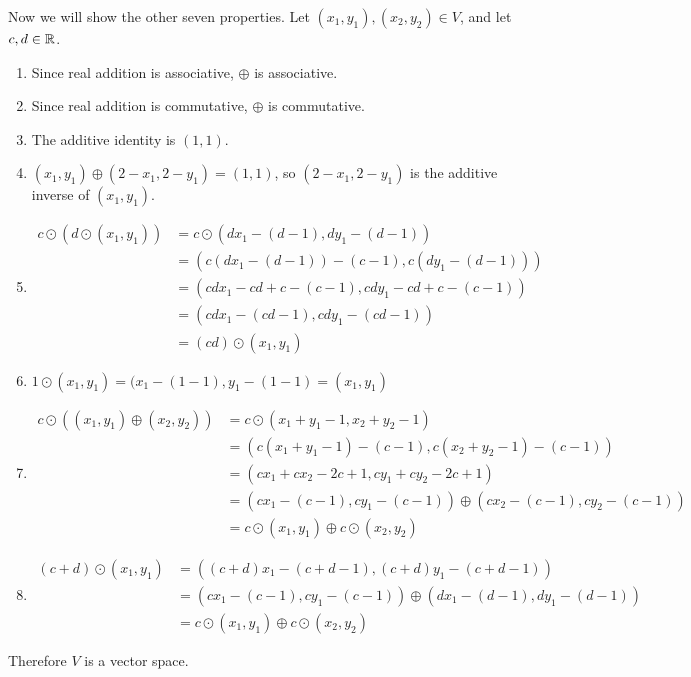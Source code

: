 \documentclass{sbgLAquiz}
\begin{document}
\begin{solution}
Now we will show the other seven properties.  Let $(x_1,y_1), (x_2,y_2) \in V$, and let $c,d \in \mathbb{R}$.
\begin{enumerate}[1)]
\item Since real addition is associative, $\oplus$ is associative.
\item Since real addition is commutative, $\oplus$ is commutative.
\item The additive identity is $(1,1)$.
\item $(x_1,y_1) \oplus (2-x_1,2-y_1) = (1,1)$, so $(2-x_1,2-y_1)$ is the additive inverse of $(x_1,y_1)$.
\item \begin{align*} c\odot \left(d \odot (x_1,y_1) \right) &=c\odot \left( dx_1-(d-1),dy_1-(d-1)\right) \\
&= \left( c\left(dx_1-(d-1) \right)-(c-1), c\left(dy_1-(d-1) \right) \right) \\
&= \left(cdx_1-cd+c-(c-1), cdy_1-cd+c-(c-1) \right) \\
&= \left(cdx_1-(cd-1), cdy_1-(cd-1) \right) \\
&= (cd) \odot (x_1,y_1)
\end{align*}
\item $1 \odot (x_1,y_1) = (x_1-(1-1),y_1-(1-1)=(x_1,y_1)$
\item \begin{align*} c \odot \left( (x_1,y_1)\oplus(x_2,y_2) \right) &=
c\odot \left( x_1+y_1-1,x_2+y_2-1 \right) \\
&= \left( c(x_1+y_1-1)-(c-1), c(x_2+y_2-1)-(c-1) \right) \\
&= (cx_1+cx_2-2c+1, cy_1+cy_2-2c+1) \\
&= \left(cx_1-(c-1),cy_1-(c-1) \right) \oplus (cx_2-(c-1),cy_2-(c-1)) \\
&=c \odot (x_1,y_1) \oplus c\odot (x_2,y_2)
\end{align*}
\item \begin{align*} (c+d) \odot (x_1,y_1) &=
\left( (c+d)x_1-(c+d-1), (c+d)y_1-(c+d-1) \right) \\
&= \left( cx_1-(c-1), cy_1-(c-1) \right) \oplus (dx_1-(d-1), dy_1-(d-1) ) \\
&= c\odot (x_1,y_1) \oplus c \odot (x_2,y_2)
\end{align*}
\end{enumerate}
Therefore $V$ is a vector space.
\end{solution}
\end{document}
